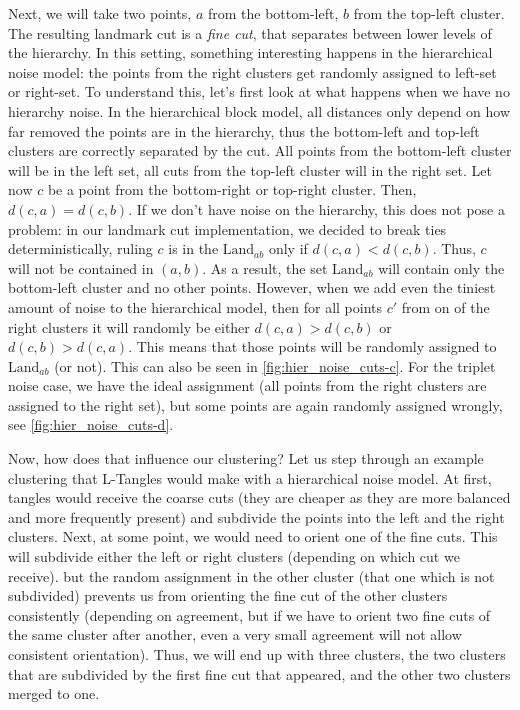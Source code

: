Next, we will take two points, $a$ from the bottom-left, $b$ from the top-left cluster. The resulting landmark cut is a \textit{fine cut}, that separates between lower levels of the hierarchy.
In this setting, something interesting happens in the hierarchical noise model: the points from the right clusters get randomly assigned to left-set or right-set. 
To understand this, let's first look at what happens when we have no hierarchy noise. 
In the hierarchical block model, all distances only depend on how far removed the points are in the hierarchy, 
thus the bottom-left and top-left clusters are correctly separated by the cut. All points from
the bottom-left cluster will be in the left set, all cuts from the top-left cluster will in the right set.
Let now $c$ be a point from the bottom-right or top-right cluster. Then, $d(c,a) = d(c,b)$. 
If we don't have noise on the hierarchy, this does not pose a problem: in our landmark cut implementation, we decided to break ties deterministically, ruling $c$ is in the 
$\text{Land}_{ab}$ only if $d(c,a) < d(c,b)$. Thus, $c$ will not be contained in $(a,b)$. As a result, the set $\text{Land}_{ab}$ will contain 
only the bottom-left cluster and no other points.
However, when we add even the tiniest amount of noise to the hierarchical model, then for all points $c'$ from on of the right clusters 
it will randomly be either $d(c,a) > d(c,b)$ or $d(c,b) > d(c,a)$. This means that those points will be randomly assigned to $\text{Land}_{ab}$ (or not).
This can also be seen in \autoref{fig:hier_noise_cuts-c}. For the triplet noise case, we have the ideal assignment (all points from the right clusters are assigned to the right set), 
but some points are again randomly assigned wrongly, see \autoref{fig:hier_noise_cuts-d}.

Now, how does that influence our clustering? Let us step through an example clustering that L-Tangles would make with a hierarchical noise model. 
At first, tangles would receive the coarse cuts (they are cheaper as they are more balanced and more frequently present) and subdivide the points into the
left and the right clusters. Next, at some point, we would need to orient one of the fine cuts. This will subdivide either the left or right clusters (depending on which cut we receive). but
the random assignment in the other cluster (that one which is not subdivided) prevents us from orienting the fine cut of the other clusters consistently (depending on agreement, but if we 
have to orient two fine cuts of the same cluster after another, even a very small agreement will not allow consistent orientation). Thus, we will end up with three clusters, the two clusters that are
subdivided by the first fine cut that appeared, and the other two clusters merged to one. 

